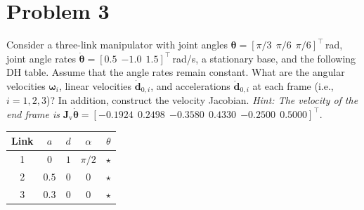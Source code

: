 \documentclass[11pt]{article}
\newcommand{\dvec}{\bm{d}}
\newcommand{\wvec}{\bm{\omega}}
\begin{document}
\bigskip
\section*{Problem 3}

\begin{statement}
Consider a three-link manipulator with joint angles $\bm{\theta}=[\pi/3\ \ \pi/6\ \ \pi/6]^{\intercal}$\,rad, joint angle rates $\dot{\bm{\theta}}=[0.5\ \ {-1.0}\ \ 1.5]^{\intercal}$\,rad/s, a stationary base, and the following DH table. Assume that the angle rates remain constant. What are the angular velocities $\wvec_i$, linear velocities $\dot{\dvec}_{0,i}$, and accelerations $\ddot{\dvec}_{0,i}$ at each frame (i.e., $i=1,2,3$)? In addition, construct the velocity Jacobian. \emph{Hint: The velocity of the end frame is} $\bm{J}_{\mathrm{v}}\dot{\bm{\theta}}=[-0.1924\ \ 0.2498\ \ {-0.3580}\ \ 0.4330\ \ {-0.2500}\ \ 0.5000]^{\intercal}$.
\begin{center}
\begin{tabular}{c|cccc}
Link & $a$ & $d$ & $\alpha$ & $\theta$ \\ \hline
1 & $0$ & $1$ & $\pi/2$ & $\star$ \\
2 & $0.5$ & $0$ & $0$ & $\star$ \\
3 & $0.3$ & $0$ & $0$ & $\star$
\end{tabular}
\end{center}
\end{statement}
\end{document}
